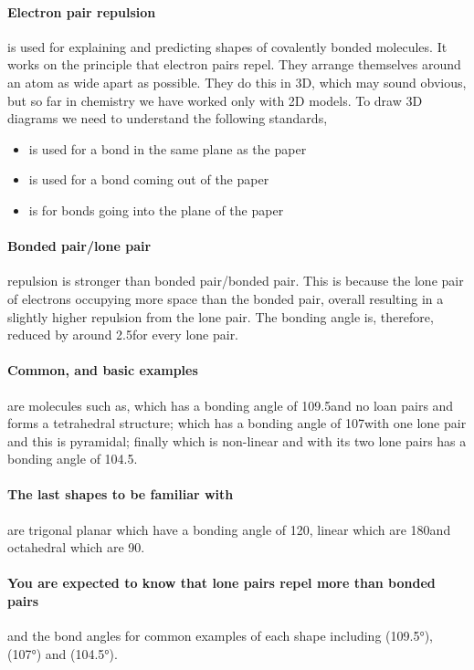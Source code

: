 	\paragraph{Electron pair repulsion} is used for explaining and predicting shapes of covalently bonded molecules.
	It works on the principle that electron pairs repel. They arrange themselves around an atom as wide apart as possible.
	They do this in 3D, which may sound obvious, but so far in chemistry we have worked only with 2D models.
	To draw 3D diagrams we need to understand the following standards,
	\begin{itemize}
		\item {} is used for a bond in the same plane as the paper
		\item {} is used for a bond coming out of the paper
		\item {} is for bonds going into the plane of the paper
	\end{itemize}
    \paragraph{Bonded pair/lone pair} repulsion is stronger than bonded pair/bonded pair.
	This is because the lone pair of electrons occupying more space than the bonded pair, overall resulting in a slightly higher repulsion from the lone pair.
	The bonding angle is, therefore, reduced by around 2.5\degree for every lone pair.
	
	\paragraph{Common, and basic examples} are molecules such as,  which has a bonding angle of 109.5\degree and no loan pairs and forms a tetrahedral structure;  which has a bonding angle of 107\degree with one lone pair and this is pyramidal; finally  which is non-linear and with its two lone pairs has a bonding angle of 104.5\degree .
	
	\paragraph{The last shapes to be familiar with} are trigonal planar which have a bonding angle of 120\degree , linear which are 180\degree and octahedral which are 90\degree . 
  \paragraph{You are expected to know that lone pairs repel more than bonded pairs} and the bond angles for common examples of each shape including  (109.5°),  (107°) and  (104.5°).
